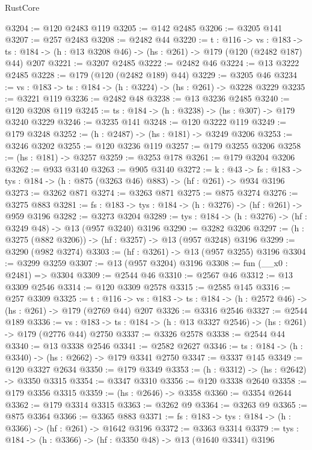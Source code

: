 \begin{lexlean}{RustCore}
\begin{coremodule}
@3204 := @120 @2483 @119
@3205 := @142 @2485
@3206 := @3205 @141
@3207 := @257 @2483
@3208 := @2482 @44
@3220 := {t : @116} ->
  {vs : @183} ->
  {ts : @184} -> (h : @13 @3208 @46) -> (hs : @261) -> @179 (@120 (@2482 @187) @44) @207
@3221 := @3207 @2485
@3222 := @2482 @46
@3224 := @13 @3222 @2485
@3228 := @179 (@120 (@2482 @189) @44)
@3229 := @3205 @46
@3234 := {vs : @183} -> {ts : @184} -> (h : @3224) -> (hs : @261) -> @3228 @3229
@3235 := @3221 @119
@3236 := @2482 @48
@3238 := @13 @3236 @2485
@3240 := @120 @3208 @119
@3245 := {ts : @184} -> (h : @3238) -> (hs : @307) -> @179 @3240 @3229
@3246 := @3235 @141
@3248 := @120 @3222 @119
@3249 := @179 @3248
@3252 := (h : @2487) -> (hs : @181) -> @3249 @3206
@3253 := @3246 @3202
@3255 := @120 @3236 @119
@3257 := @179 @3255 @3206
@3258 := (hs : @181) -> @3257
@3259 := @3253 @178
@3261 := @179 @3204 @3206
@3262 := @933 @3140
@3263 := @905 @3140
@3272 := {k : @43} ->
  {fs : @183} -> {tys : @184} -> (h : @875 (@3263 @46) @883) -> (hf : @261) -> @934 @3196
@3273 := @3262 @871
@3274 := @3263 @871
@3275 := @875 @3274
@3276 := @3275 @883
@3281 := {fs : @183} -> {tys : @184} -> (h : @3276) -> (hf : @261) -> @959 @3196
@3282 := @3273 @3204
@3289 := {tys : @184} -> (h : @3276) -> (hf : @3249 @48) -> @13 (@957 @3240) @3196
@3290 := @3282 @3206
@3297 := (h : @3275 (@882 @3206)) -> (hf : @3257) -> @13 (@957 @3248) @3196
@3299 := @3290 (@982 @3274)
@3303 := (hf : @3261) -> @13 (@957 @3255) @3196
@3304 := @3299 @3259
@3307 := @13 (@957 @3204) @3196
@3308 := fun (__x0 : @2481) => @3304
@3309 := @2544 @46
@3310 := @2567 @46
@3312 := @13 @3309 @2546
@3314 := @120 @3309 @2578
@3315 := @2585 @145
@3316 := @257 @3309
@3325 := {t : @116} ->
  {vs : @183} -> {ts : @184} -> (h : @2572 @46) -> (hs : @261) -> @179 (@2769 @44) @207
@3326 := @3316 @2546
@3327 := @2544 @189
@3336 := {vs : @183} ->
  {ts : @184} -> (h : @13 @3327 @2546) -> (hs : @261) -> @179 (@2776 @44) @2750
@3337 := @3326 @2578
@3338 := @2544 @44
@3340 := @13 @3338 @2546
@3341 := @2582 @2627
@3346 := {ts : @184} -> (h : @3340) -> (hs : @2662) -> @179 @3341 @2750
@3347 := @3337 @145
@3349 := @120 @3327 @2634
@3350 := @179 @3349
@3353 := (h : @3312) -> (hs : @2642) -> @3350 @3315
@3354 := @3347 @3310
@3356 := @120 @3338 @2640
@3358 := @179 @3356 @3315
@3359 := (hs : @2646) -> @3358
@3360 := @3354 @2644
@3362 := @179 @3314 @3315
@3363 := @3262 @9
@3364 := @3263 @9
@3365 := @875 @3364
@3366 := @3365 @883
@3371 := {fs : @183} -> {tys : @184} -> (h : @3366) -> (hf : @261) -> @1642 @3196
@3372 := @3363 @3314
@3379 := {tys : @184} -> (h : @3366) -> (hf : @3350 @48) -> @13 (@1640 @3341) @3196

\end{coremodule}
\end{lexlean}
